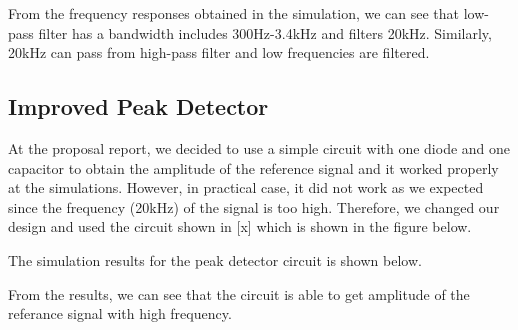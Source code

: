 \documentclass[conference]{IEEEtran}
\begin{document}
From the frequency responses obtained in the simulation, we can see that low-pass filter has a bandwidth includes 300Hz-3.4kHz and filters 20kHz. 
Similarly, 20kHz can pass from high-pass filter and low frequencies are filtered. 

\subsection{Improved Peak Detector}
At the proposal report, we decided to use a simple circuit with one diode and one capacitor to obtain the amplitude 
of the reference signal and it worked properly at the simulations. However, in practical case, it did not work as we expected 
since the frequency (20kHz) of the signal is too high. Therefore, we changed our design and used the circuit shown in \cite{peak}[x] which is 
shown in the figure below.

The simulation results for the peak detector circuit is shown below.

From the results, we can see that the circuit is able to get amplitude of the referance signal with high frequency.
\end{document}
